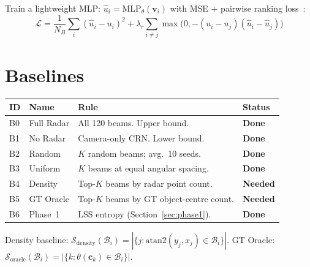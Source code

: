 \documentclass[12pt, a4paper]{article}
\newcommand{\beam}{\mathcal{B}}
\theoremstyle{definition}
\begin{document}
Train a lightweight MLP: $\hat{u}_i = \mathrm{MLP}_\theta(\mathbf{v}_i)$
with MSE + pairwise ranking loss~\cite{burges2005learning}:
\begin{equation}
  \mathcal{L}
  = \frac{1}{N_B}\sum_i(\hat{u}_i-u_i)^2
  + \lambda_r\sum_{i\neq j}\max\!\bigl(0,-(u_i-u_j)(\hat{u}_i-\hat{u}_j)\bigr)
  \label{eq:scorer_loss}
\end{equation}

\section{Baselines}
\label{sec:baselines}

\begin{center}
\renewcommand{\arraystretch}{1.4}
\begin{tabular}{llp{6cm}l}
  \toprule
  \textbf{ID} & \textbf{Name} & \textbf{Rule} & \textbf{Status} \\
  \midrule
  B0 & Full Radar & All 120 beams. Upper bound.
    & \textcolor{donegreen}{\textbf{Done}} \\
  B1 & No Radar & Camera-only CRN. Lower bound.
    & \textcolor{donegreen}{\textbf{Done}} \\
  B2 & Random & $K$ random beams; avg.\ 10 seeds.
    & \textcolor{donegreen}{\textbf{Done}} \\
  B3 & Uniform & $K$ beams at equal angular spacing.
    & \textcolor{donegreen}{\textbf{Done}} \\
  B4 & Density & Top-$K$ beams by radar point count.
    & \textcolor{inprogressorange}{\textbf{Needed}} \\
  B5 & GT Oracle & Top-$K$ beams by GT object-centre count.
    & \textcolor{inprogressorange}{\textbf{Needed}} \\
  B6 & Phase~1 & LSS entropy (Section~\ref{sec:phase1}).
    & \textcolor{donegreen}{\textbf{Done}} \\
  \bottomrule
\end{tabular}
\end{center}

Density baseline: $\mathcal{S}_\mathrm{density}(\beam_i)
= |\{j:\mathrm{atan2}(y_j,x_j)\in\beam_i\}|$.
GT Oracle: $\mathcal{S}_\mathrm{oracle}(\beam_i)
= |\{k:\theta(\mathbf{c}_k)\in\beam_i\}|$.

\end{document}
